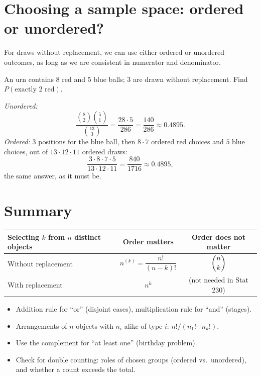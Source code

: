 \section{Choosing a sample space: ordered or unordered?}

For draws without replacement, we can use either ordered or unordered outcomes, as long as
we are consistent in numerator and denominator.

\begin{example}
An urn contains $8$ red and $5$ blue balls; $3$ are drawn without replacement. Find
$P(\text{exactly 2 red})$.

\emph{Unordered:}
\[
  \frac{\binom82\binom51}{\binom{13}3} = \frac{28\cdot 5}{286} = \frac{140}{286} \approx 0.4895.
\]
\emph{Ordered:} $3$ positions for the blue ball, then $8\cdot 7$ ordered red choices and
$5$ blue choices, out of $13\cdot12\cdot11$ ordered draws:
\[
  \frac{3\cdot 8\cdot 7\cdot 5}{13\cdot 12\cdot 11} = \frac{840}{1716} \approx 0.4895,
\]
the same answer, as it must be.
\end{example}

\section{Summary}

\begin{center}
\begin{tabular}{lcc}
\toprule
Selecting $k$ from $n$ distinct objects & Order matters & Order does not matter \\
\midrule
Without replacement & $n^{(k)} = \dfrac{n!}{(n-k)!}$ & $\dbinom nk$ \\
With replacement & $n^k$ & (not needed in Stat 230) \\
\bottomrule
\end{tabular}
\end{center}

\begin{itemize}
  \item Addition rule for ``or'' (disjoint cases), multiplication rule for ``and'' (stages).
  \item Arrangements of $n$ objects with $n_i$ alike of type $i$: $n!/(n_1!\cdots n_k!)$.
  \item Use the complement for ``at least one'' (birthday problem).
  \item Check for double counting: roles of chosen groups (ordered vs.\ unordered),
        and whether a count exceeds the total.
\end{itemize}
